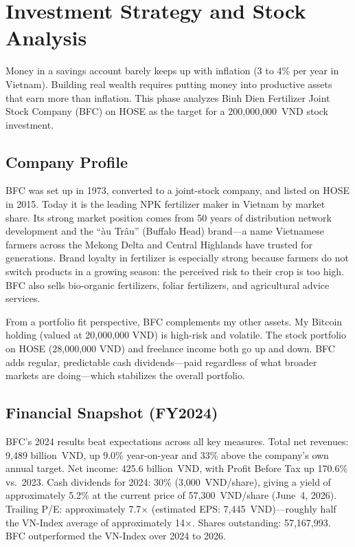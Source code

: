 \chapter{Investment Strategy and Stock Analysis}

Money in a savings account barely keeps up with inflation (3 to 4\% per year in Vietnam). Building real wealth requires putting money into productive assets that earn more than inflation. This phase analyzes Binh Dien Fertilizer Joint Stock Company (BFC) on HOSE as the target for a 200,000,000~VND stock investment.

\section{Company Profile}

BFC was set up in 1973, converted to a joint-stock company, and listed on HOSE in 2015. Today it is the leading NPK fertilizer maker in Vietnam by market share. Its strong market position comes from 50 years of distribution network development and the ``\DH\`{a}u Tr\^{a}u'' (Buffalo Head) brand---a name Vietnamese farmers across the Mekong Delta and Central Highlands have trusted for generations. Brand loyalty in fertilizer is especially strong because farmers do not switch products in a growing season: the perceived risk to their crop is too high. BFC also sells bio-organic fertilizers, foliar fertilizers, and agricultural advice services.

From a portfolio fit perspective, BFC complements my other assets. My Bitcoin holding (valued at 20,000,000 VND) is high-risk and volatile. The stock portfolio on HOSE (28,000,000 VND) and freelance income both go up and down. BFC adds regular, predictable cash dividends---paid regardless of what broader markets are doing---which stabilizes the overall portfolio.

\section{Financial Snapshot (FY2024)}

BFC's 2024 results beat expectations across all key measures. Total net revenues: 9,489 billion~VND, up 9.0\% year-on-year and 33\% above the company's own annual target. Net income: 425.6 billion~VND, with Profit Before Tax up 170.6\% vs.\ 2023. Cash dividends for 2024: 30\% (3,000~VND/share), giving a yield of approximately 5.2\% at the current price of 57,300~VND/share (June~4, 2026). Trailing P/E: approximately 7.7$\times$ (estimated EPS: 7,445~VND)---roughly half the VN-Index average of approximately 14$\times$. Shares outstanding: 57,167,993. BFC outperformed the VN-Index over 2024 to 2026.

